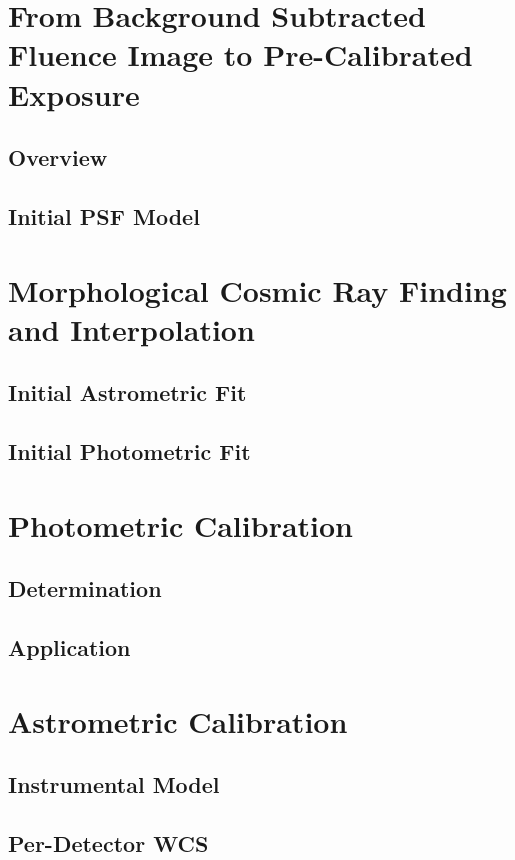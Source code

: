 \section{From Background Subtracted Fluence Image to Pre-Calibrated Exposure}

\subsection{Overview}

\subsection{Initial PSF Model}

\section{Morphological Cosmic Ray Finding and Interpolation}

\subsection{Initial Astrometric Fit}

\subsection{Initial Photometric Fit}

\section{Photometric Calibration}

\subsection{Determination}

\subsection{Application}



\section{Astrometric Calibration}

\subsection{Instrumental Model}

\subsection{Per-Detector WCS}



	
